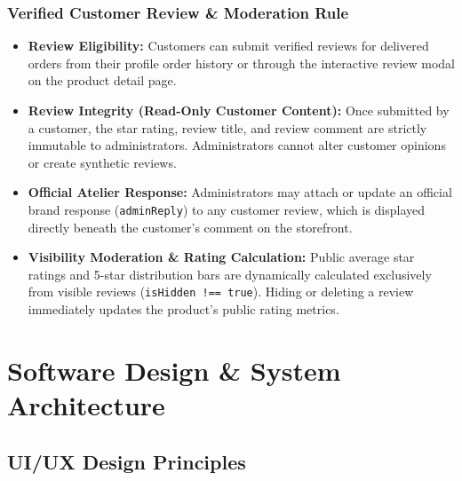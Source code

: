 \documentclass[12pt,a4paper,oneside]{report}
\begin{document}
\subsection{Verified Customer Review \& Moderation Rule}
\begin{itemize}[leftmargin=1.2cm]
    \item \textbf{Review Eligibility:} Customers can submit verified reviews for delivered orders from their profile order history or through the interactive review modal on the product detail page.
    \item \textbf{Review Integrity (Read-Only Customer Content):} Once submitted by a customer, the star rating, review title, and review comment are strictly immutable to administrators. Administrators cannot alter customer opinions or create synthetic reviews.
    \item \textbf{Official Atelier Response:} Administrators may attach or update an official brand response (\texttt{adminReply}) to any customer review, which is displayed directly beneath the customer's comment on the storefront.
    \item \textbf{Visibility Moderation \& Rating Calculation:} Public average star ratings and 5-star distribution bars are dynamically calculated exclusively from visible reviews (\texttt{isHidden !== true}). Hiding or deleting a review immediately updates the product's public rating metrics.
\end{itemize}

\chapter{Software Design \& System Architecture}

\section{UI/UX Design Principles}
\end{document}
